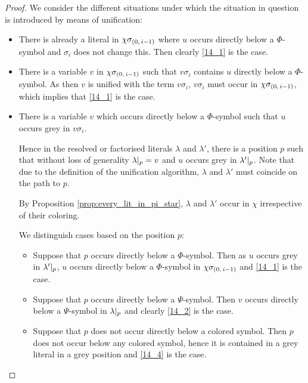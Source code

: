 \documentclass[,%
	draft=false,%
	numbers=noendperiod
	12pt,
	a4paper,
	oneside,%
	openany,
]{memoir}
\newcommand{\inv}{\ensuremath{\chi}}
\begin{document}
\begin{proof}
	We consider the different situations under which the situation in question is introduced by means of unification: 

	\begin{itemize}
		\item
			There is already a literal in $\inv\sigmazmi$ where $u$ occurs directly below a $\Phi$-symbol and $\sigma_i$ does not change this.
			Then clearly \ref{14_1} is the case.

		\item
			There is a variable $v$ in $\inv\sigmazmi$ such that $v\sigma_i$ contains $u$ directly below a $\Phi$-symbol.
			As then $v$ is unified with the term $v\sigma_i$, $v\sigma_i$ must occur in $\inv\sigmazmi$, which implies that \ref{14_1} is the case.

		\item
			There is a variable $v$ which occurs directly below a $\Phi$-symbol such that $u$ occurs grey in $v\sigma_i$.

			Hence in the resolved or factorised literals $\lambda$ and $\lambda'$, there is a position $p$ such that without loss of generality $\lambda|_{p} = v$ and $u$ occurs grey in $\lambda'|_{p}$. 
			Note that due to the definition of the unification algorithm, $\lambda$ and $\lambda'$ must coincide on the path to $p$.

			By Proposition \ref{prop:every_lit_in_pi_star}, $\lambda$ and $\lambda'$ occur in $\inv$ irrespective of their coloring.


			We distinguish cases based on the position $p$:

			\begin{itemize}
				\item Suppose that $p$ occurs directly below a $\Phi$-symbol.
					Then as $u$ occurs grey in  $\lambda'|_{p}$, $u$ occurs directly below a $\Phi$-symbol in $\inv\sigmazmi$ and \ref{14_1} is the case.

				\item Suppose that $p$ occurs directly below a $\Psi$-symbol.
					Then $v$ occurs directly below a $\Psi$-symbol in $\lambda|_{p}$ and clearly \ref{14_2} is the case.

				\item
					Suppose that $p$ does not occur directly below a colored symbol.
					Then $p$ does not occur below any colored symbol, hence it is contained in a grey literal in a grey position and \ref{14_4} is the case.

			\end{itemize}
	\end{itemize}

\end{proof}
\end{document}
